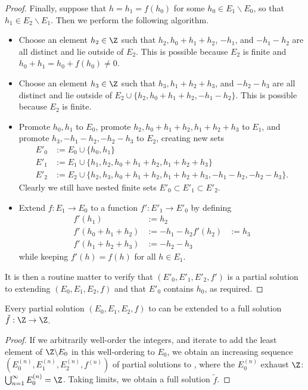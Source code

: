 \begin{proof}
Finally, suppose that $h = h_1 = f(h_0)$ for some $h_0 \in E_1 \backslash E_0$, so that $h_1 \in E_2 \backslash E_1$.  Then we perform the following algorithm.
\begin{itemize}
  \item Choose an element $h_2 \in \Z$ such that $h_2, h_0+h_1+h_2$, $-h_1$, and $-h_1-h_2$ are all distinct and lie outside of $E_2$.  This is possible because $E_2$ is finite and $h_0+h_1 = h_0+f(h_0) \neq 0$.
  \item Choose an element $h_3 \in \Z$ such that $h_3, h_1+h_2+h_3$, and $-h_2-h_3$ are all distinct and lie outside of $E_2 \cup \{h_2, h_0+h_1+h_2,-h_1-h_2\}$.  This is possible because $E_2$ is finite.
  \item Promote $h_0, h_1$ to $E_0$, promote $h_2, h_0+h_1+h_2, h_1+h_2+h_3$ to $E_1$, and promote $h_3, -h_1-h_2,-h_2-h_3$ to $E_2$, creating new sets
\begin{align*}
  E'_0 &:= E_0 \cup \{h_0, h_1 \}\\
  E'_1 &:= E_1 \cup \{h_1, h_2, h_0+h_1+h_2, h_1+h_2+h_3 \}\\
  E'_2 &:= E_2 \cup \{h_2, h_3, h_0+h_1+h_2, h_1+h_2+h_3, -h_1-h_2, -h_2-h_3\}.
\end{align*}
Clearly we still have nested finite sets $E'_0 \subset E'_1 \subset E'_2$.
\item Extend $f : E_1 \to E_0$ to a function $f': E'_1 \to E'_0$ by defining
\begin{align*}
  f'(h_1) &:= h_2 \\
  f'(h_0+h_1+h_2) &:= -h_1-h_2
  f'(h_2) &:= h_3 \\
  f'(h_1+h_2+h_3) &:= -h_2-h_3
\end{align*}
while keeping $f'(h)=f(h)$ for all $h \in E_1$.
\end{itemize}
It is then a routine matter to verify that $(E'_0,E'_1,E'_2,f')$ is a partial solution to  extending $(E_0,E_1,E_2,f)$ and that $E'_0$ contains $h_0$, as required.
\end{proof}

\begin{corollary} \label{extend} Every partial solution $(E_0,E_1,E_2,f)$ to  can be extended to a full solution $\tilde f: \Z \to \Z$.
\end{corollary}

\begin{proof}
  If we arbitrarily well-order the integers, and iterate  to add the least element of $\Z \backslash E_0$ in this well-ordering to $E_0$, we obtain an increasing sequence $(E^{(n)}_0, E^{(n)}_1, E^{(n)}_2, f^{(n)})$ of partial solutions to , where the $E^{(n)}_0$ exhaust $\Z$: $\bigcup_{n=1}^\infty E^{(n)}_0 = \Z$.  Taking limits, we obtain a full solution $\tilde f$.
\end{proof}

